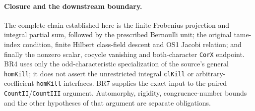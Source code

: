 \paragraph{Closure and the downstream boundary.}
The complete chain established here is the finite Frobenius projection
and integral partial sum, followed by the prescribed Bernoulli unit;
the original tame-index condition, finite Hilbert class-field descent
and OS1 Jacobi relation; and finally the nonzero scalar, cocycle
vanishing and both-character \texttt{CorX} endpoint.
BR4 uses only the odd-characteristic specialization of the source's
general \texttt{homKill}; it does not assert the unrestricted
integral \texttt{clKill} or arbitrary-coefficient \texttt{homKill}
interfaces.  BR7 supplies the exact input to the paired
\texttt{CountII}/\texttt{CountIII} argument.  Automorphy, rigidity,
congruence-number bounds and the other hypotheses of that argument
are separate obligations.
